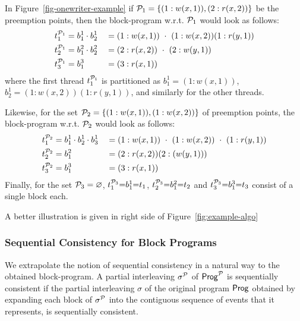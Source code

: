 \begin{example}\label{eg:block-program}
In Figure~\ref{fig-onewriter-example} if $\mathcal{P}_1=\{(1:w(x,1)), (2:r(x,2))\}$ be the preemption points, then the block-program w.r.t. $\mathcal{P}_1$ would look as follows: 
\begin{alignat*}{2}
    t^{\mathcal{P}_1}_1 &=b^1_1\cdot b_2^1 &&=(1:w(x,1)) ~\cdot~ (1:w(x,2))(1:r(y,1))\\
     t^{\mathcal{P}_1}_2 
     &= b^2_1\cdot b_2^2 &&=(2:r(x,2)) ~\cdot~ (2:w(y,1))\\
      t^{\mathcal{P}_1}_3 &=b^3_1 &&=(3:r(x,1))
\end{alignat*}
where the first thread $t^{\mathcal{P}_1}_1$ is partitioned as  $b_1^1=(1:w(x,1))$, $b_2^1=(1:w(x,2))(1:r(y,1))$, and similarly for the other threads. 

Likewise, for the set $\mathcal{P}_2=\{(1:w(x,1)), (1:w(x,2))\}$ of preemption points, the block-program w.r.t. $\mathcal{P}_2$ would look as follows: 
\begin{alignat*}{2}\label{blockpartition}
    t^{\mathcal{P}_2}_1 &= b^1_1\cdot b_2^1\cdot b_3^1 &&=(1:w(x,1)) ~\cdot~(1:w(x,2))~\cdot~ (1:r(y,1))\\
     t^{\mathcal{P}_2}_2 
     &=b_1^2 &&=(2:r(x,2))(2:(w(y,1)))\\
      t^{\mathcal{P}_2}_3 &=b_1^3 &&= (3:r(x,1))
\end{alignat*}
Finally, for the set $\mathcal{P}_3=\varnothing$, $t^{\mathcal{P}_3}_1{=} b^1_1 {=} t_1$,  
$t^{\mathcal{P}_3}_2{=} b^2_1 {=} t_2$ and $t^{\mathcal{P}_3}_3{=} b^3_1 {=} t_3$ consist of a single block each.
\end{example}

A better illustration is given in right side of Figure~\ref{fig:example-algo} 
\subsubsection*{Sequential Consistency for Block Programs} We extrapolate the notion of sequential consistency in a natural way to the obtained block-program. A partial interleaving $\sigma^{\mathcal{P}}$ of $\mathsf{Prog}^{\mathcal{P}}$ is sequentially consistent if the partial interleaving $\sigma$ of the original program $\mathsf{Prog}$ obtained by expanding each block of $\sigma^{\mathcal{P}}$ into the contiguous sequence of events that it represents, is sequentially consistent. 

